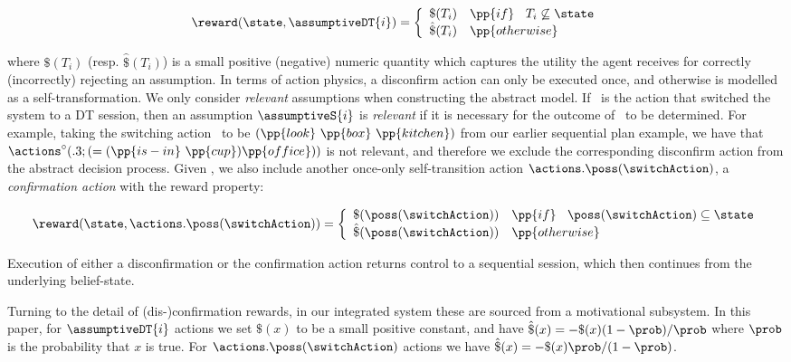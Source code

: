 \vspace{-1ex}
\small
\[
\reward(\state, \assumptiveDT{i}) = \bigg\{ \begin{array}{ll}
\$(T_i) & \pp{if}~\;\;T_i \not\subseteq \state \\
\hat\$(T_i) & \pp{otherwise} \\
\end{array}
\]
\normalsize

\vspace{-1ex}

\noindent where $\$(T_i)$ (resp. $\hat\$(T_i)$) is a small positive
(negative) numeric quantity which captures the utility the agent
receives for correctly (incorrectly) rejecting an assumption.  In
terms of action physics, a disconfirm action can only be executed
once, and otherwise is modelled as a self-transformation.  We only
consider {\em relevant} assumptions when constructing the abstract
model.  If \switchAction\ is the action that switched the system to a
DT session, then an assumption $\assumptiveS{i}$ is {\em relevant} if
it is necessary for the outcome of \switchAction\ to be
determined. For example, taking the switching action \switchAction\ to
be $(\pp{look}~\pp{box}~\pp{kitchen})$ from our earlier sequential
plan example, we have that
$\actions^{\circ}(.3;(=(\pp{is-in}~\pp{cup})\pp{office}))$ is not
relevant, and therefore we exclude the corresponding disconfirm action
from the abstract decision process. Given \switchAction, we also
include another once-only self-transition action
$\actions.\poss(\switchAction)$, a \emph{confirmation action} with the
reward property:

\[
\reward(\state, \actions.\poss(\switchAction)) = \bigg\{ \begin{array}{ll}
\$(\poss(\switchAction)) & \pp{if}~\;\; \poss(\switchAction) \subseteq \state \\
\hat\$(\poss(\switchAction)) & \pp{otherwise} \\
\end{array}
\]

\noindent Execution of either a disconfirmation or the confirmation action
returns control to a sequential session, which then continues from the
underlying belief-state.

Turning to the detail of (dis-)confirmation rewards, in our integrated
system these are sourced from a motivational subsystem. In this paper,
for $\assumptiveDT{i}$ actions we set $\$(x)$ to be a small positive
constant, and have $\hat\$(x)= - \$(x)(1 - \prob) /
\prob$ where $\prob$ is the probability that $x$ is true. For
$\actions.\poss(\switchAction)$ actions we have $\hat\$(x)= -
\$(x)\prob/(1-\prob)$.


